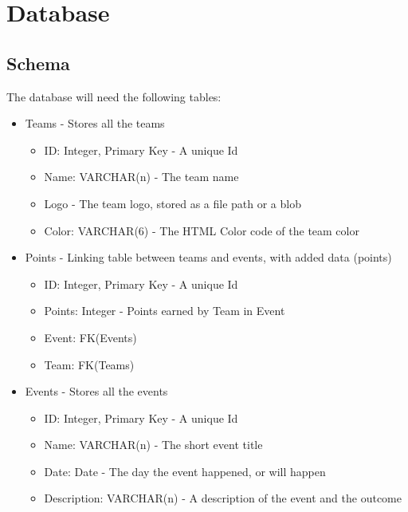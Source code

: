 \documentclass{scrreprt}
\begin{document}
\chapter{Database}
    \section{Schema}
    The database will need the following tables:
    
    \begin{itemize}
        \item Teams - Stores all the teams
        \begin{itemize}
            \item ID: Integer, Primary Key - A unique Id
            \item Name: VARCHAR(n) - The team name
            \item Logo - The team logo, stored as a file path or a blob
            \item Color: VARCHAR(6) - The HTML Color code of the team color
        \end{itemize}
        
        \item Points - Linking table between teams and events, with added data (points)
        \begin{itemize}
            \item ID: Integer, Primary Key - A unique Id
            \item Points: Integer - Points earned by Team in Event
            \item Event: FK(Events)
            \item Team: FK(Teams)
        \end{itemize}
        
        \item Events - Stores all the events
        \begin{itemize}
            \item ID: Integer, Primary Key - A unique Id
            \item Name: VARCHAR(n) - The short event title
            \item Date: Date - The day the event happened, or will happen
            \item Description: VARCHAR(n) - A description of the event and the outcome
        \end{itemize}
        

\end{itemize}
\end{document}
